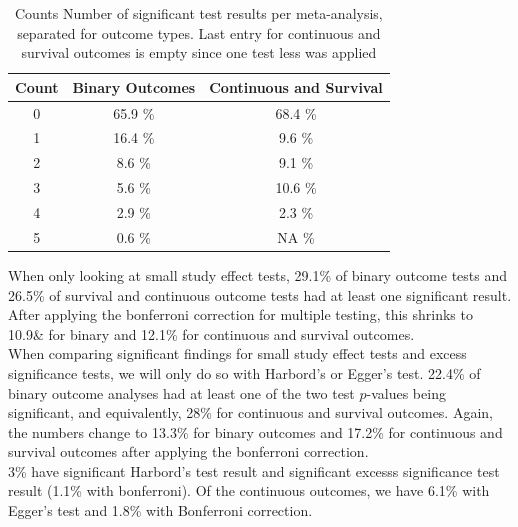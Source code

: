 \documentclass[11pt,a4paper,twoside]{book}\usepackage[]{graphicx}\usepackage[]{color}
\begin{document}
\begin{table}[ht]
\centering
\begingroup\footnotesize
\begin{tabular}{ccc}
  \hline
Count & Binary Outcomes & Continuous and Survival \\ 
  \hline
  0 & 65.9 \% & 68.4 \% \\ 
    1 & 16.4 \% & 9.6 \% \\ 
    2 & 8.6 \% & 9.1 \% \\ 
    3 & 5.6 \% & 10.6 \% \\ 
    4 & 2.9 \% & 2.3 \% \\ 
    5 & 0.6 \% & NA \% \\ 
   \hline
\end{tabular}
\endgroup
\caption{Counts Number of significant test results per meta-analysis, separated
       for outcome types. Last entry for continuous and survival outcomes is empty since one test less was 
       applied} 
\label{number.sig.tests}
\end{table}


When only looking at small study effect tests, 29.1\% of binary outcome tests and 26.5\% of survival and continuous outcome tests had at least one significant result. After applying the bonferroni correction for multiple testing, this shrinks to 10.9\& for binary and 12.1\% for continuous and survival outcomes. \\
When comparing significant findings for small study effect tests and excess significance tests, we will only do so with Harbord's or Egger's test. 22.4\% of binary outcome analyses had at least one of the two test $p$-values being significant, and equivalently, 28\% for continuous and survival outcomes. Again, the numbers change to 13.3\% for binary outcomes and 17.2\% for continuous and survival outcomes after applying the bonferroni correction. \\
3\% have significant Harbord's test result and significant excesss significance test result  (1.1\% with bonferroni). Of the continuous outcomes, we have 6.1\% with Egger's test and 1.8\% with Bonferroni correction. 

\end{document}

